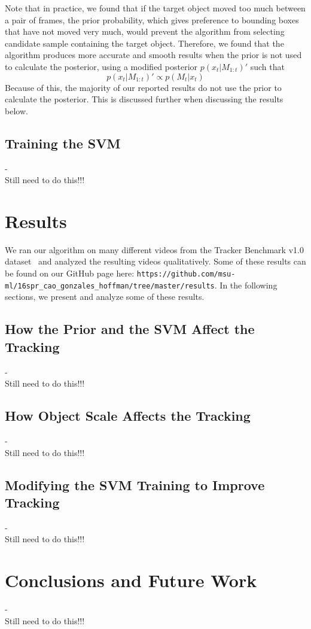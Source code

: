 \documentclass{sig-alternate-05-2015}
\newcommand{\todo}{{\\ \huge \color{red} Still need to do this!!!}} %
\begin{document}
Note that in practice, we found that if the target object moved too much between a pair of frames, the prior probability, which gives preference to bounding boxes that have not moved very much, would prevent the algorithm from selecting candidate sample containing the target object.
Therefore, we found that the algorithm produces more accurate and smooth results when the prior is not used to calculate the posterior, using a modified posterior $p(x_t|M_{1:t})'$ such that
\begin{equation}
\label{eq:posterior-mod}
p(x_t|M_{1:t})' \propto p(M_t |x_t)
\end{equation}
Because of this, the majority of our reported results do not use the prior to calculate the posterior.
This is discussed further when discussing the results below.

\subsection{Training the SVM}
\label{sec:training-svm} %
-
\todo

\section{Results}
We ran our algorithm on many different videos from the Tracker Benchmark v1.0 dataset~\cite{wu2013online} and analyzed the resulting videos qualitatively.
Some of these results can be found on our GitHub page here: \verb!https://github.com/msu-ml/16spr_cao_gonzales_hoffman/tree/master/results!.
In the following sections, we present and analyze some of these results.

\subsection*{How the Prior and the SVM Affect the Tracking}
-
\todo

\subsection*{How Object Scale Affects the Tracking}
-
\todo

\subsection*{Modifying the SVM Training to Improve Tracking}
-
\todo

\section{Conclusions and Future Work}
-
\todo
\end{document}
